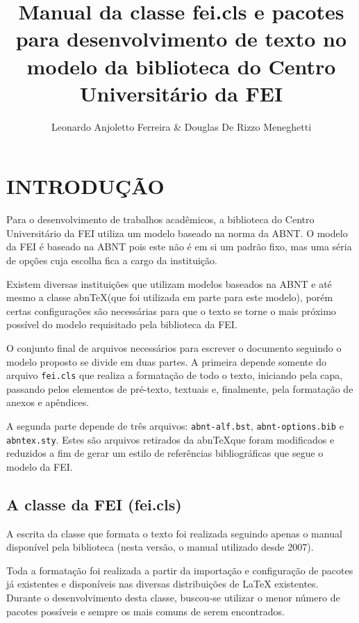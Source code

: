 \documentclass{fei}
\begin{document}
\author{Leonardo Anjoletto Ferreira \& Douglas De Rizzo Meneghetti}
\title{Manual da classe fei.cls e pacotes para desenvolvimento de texto no modelo da biblioteca do Centro Universitário da FEI}

\maketitle
\sumario

\chapter{INTRODUÇÃO}

Para o desenvolvimento de trabalhos acadêmicos, a biblioteca do Centro Universitário da FEI utiliza um modelo baseado na norma da ABNT. O modelo da FEI é baseado na ABNT pois este não é em si um padrão fixo, mas uma séria de opções cuja escolha fica a cargo da instituição.

Existem diversas instituições que utilizam modelos baseados na ABNT e até mesmo a classe abn\TeX (que foi utilizada em parte para este modelo), porém certas configurações são necessárias para que o texto se torne o mais próximo possível do modelo requisitado pela biblioteca da FEI.

O conjunto final de arquivos necessários para escrever o documento seguindo o modelo proposto se divide em duas partes. A primeira depende somente do arquivo \texttt{fei.cls} que realiza a formatação de todo o texto, iniciando pela capa, passando pelos elementos de pré-texto, textuais e, finalmente, pela formatação de anexos e apêndices. 

A segunda parte depende de três arquivos: \texttt{abnt-alf.bst}, \texttt{abnt-options.bib} e \texttt{abntex.sty}. Estes são arquivos retirados da abn\TeX que foram modificados e reduzidos a fim de gerar um estilo de referências bibliográficas que segue o modelo da FEI.

\section{A classe da FEI (fei.cls)}

A escrita da classe que formata o texto foi realizada seguindo apenas o manual disponível pela biblioteca (nesta versão, o manual utilizado desde 2007).

Toda a formatação foi realizada a partir da importação e configuração de pacotes já existentes e disponíveis nas diversas distribuições de \LaTeX{} existentes. Durante o desenvolvimento desta classe, buscou-se utilizar o menor número de pacotes possíveis e sempre os mais comuns de serem encontrados.
\end{document}
